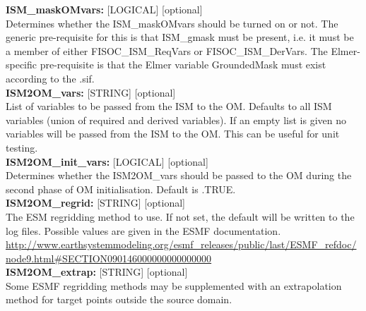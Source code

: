 \documentclass[11pt]{article}
\begin{document}
\begin{flushleft}
\textbf{ISM\_maskOMvars:} [LOGICAL] [optional]                             \\
Determines whether the ISM\_maskOMvars should be turned on or not. The generic
pre-requisite for this is that ISM\_gmask must be present, i.e. it must be a 
member of either FISOC\_ISM\_ReqVars or FISOC\_ISM\_DerVars.
The Elmer-specific pre-requisite is that the Elmer variable GroundedMask must
exist according to the .sif.                                               \\
\vspace{6pt}
\textbf{ISM2OM\_vars:}        [STRING] [optional]                          \\
List of variables to be passed from the ISM to the OM. Defaults to 
all ISM variables (union of required and derived variables). If an empty 
list is given no variables will be passed from the ISM to the OM.  This 
can be useful for unit testing.                                            \\ 
\vspace{6pt}
\textbf{ISM2OM\_init\_vars:}  [LOGICAL] [optional]                         \\
Determines whether the ISM2OM\_vars should be passed to the OM during the 
second phase of OM initialisation.   Default is .TRUE.                     \\ 
\vspace{6pt}
\textbf{ISM2OM\_regrid:}       [STRING] [optional]                         \\
The ESM regridding method to use.  If not set, the default will be 
written to the log files.  Possible values are given in the ESMF 
documentation. 
\url{http://www.earthsystemmodeling.org/esmf_releases/public/last/ESMF_refdoc/node9.html#SECTION090146000000000000000} \\
\vspace{6pt}
\textbf{ISM2OM\_extrap:}       [STRING] [optional]                         \\
Some ESMF regridding methods may be supplemented with an extrapolation
method for target points outside the source domain.
\vspace{6pt}


\end{flushleft}
\end{document}
